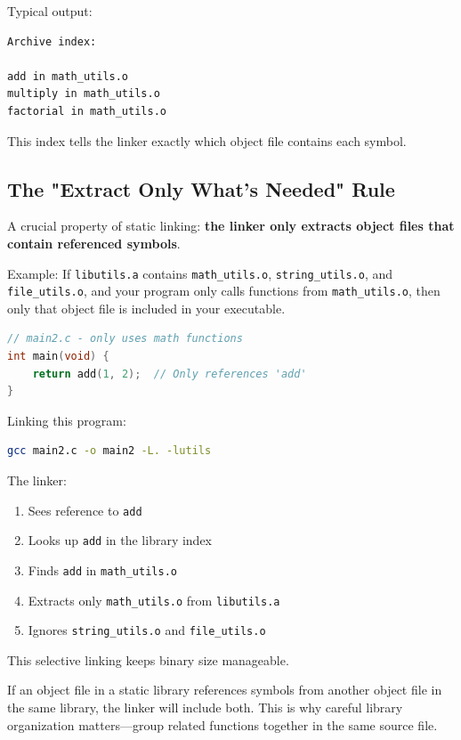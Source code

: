 Typical output:
\begin{verbatim}
Archive index:

add in math_utils.o
multiply in math_utils.o
factorial in math_utils.o
\end{verbatim}

This index tells the linker exactly which object file contains each symbol.

\subsection{The "Extract Only What's Needed" Rule}

A crucial property of static linking: \textbf{the linker only extracts object files that contain referenced symbols}.

Example: If \texttt{libutils.a} contains \texttt{math\_utils.o}, \texttt{string\_utils.o}, and \texttt{file\_utils.o}, and your program only calls functions from \texttt{math\_utils.o}, then only that object file is included in your executable.

\begin{lstlisting}[language=C]
// main2.c - only uses math functions
int main(void) {
    return add(1, 2);  // Only references 'add'
}
\end{lstlisting}

Linking this program:
\begin{lstlisting}[language=bash]
gcc main2.c -o main2 -L. -lutils
\end{lstlisting}

The linker:
\begin{enumerate}
    \item Sees reference to \texttt{add}
    \item Looks up \texttt{add} in the library index
    \item Finds \texttt{add} in \texttt{math\_utils.o}
    \item Extracts only \texttt{math\_utils.o} from \texttt{libutils.a}
    \item Ignores \texttt{string\_utils.o} and \texttt{file\_utils.o}
\end{enumerate}

This selective linking keeps binary size manageable.

\begin{warning}
If an object file in a static library references symbols from another object file in the same library, the linker will include both. This is why careful library organization matters—group related functions together in the same source file.
\end{warning}

